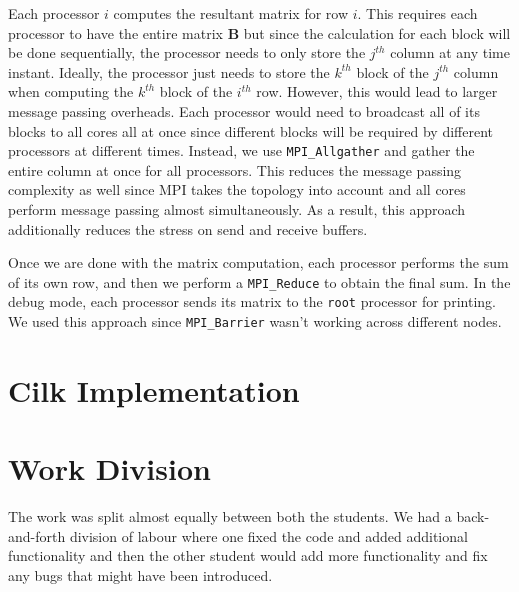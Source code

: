 \documentclass[11pt]{article}
\begin{document}
Each processor $i$ computes the resultant matrix for row $i$. This requires each processor to have the entire matrix $\mathbf{B}$ but since the calculation for each block will be done sequentially, the processor needs to only store the $j^{th}$ column at any time instant. Ideally, the processor just needs to store the $k^{th}$ block of the $j^{th}$ column when computing the $k^{th}$ block of the $i^{th}$ row. However, this would lead to larger message passing overheads. Each processor would need to broadcast all of its blocks to all cores all at once since different blocks will be required by different processors at different times. Instead, we use \texttt{MPI\_Allgather} and gather the entire column at once for all processors. This reduces the message passing complexity as well since MPI takes the topology into account and all cores perform message passing almost simultaneously. As a result, this approach additionally reduces the stress on send and receive buffers.

Once we are done with the matrix computation, each processor performs the sum of its own row, and then we perform a \texttt{MPI\_Reduce} to obtain the final sum. In the debug mode, each processor sends its matrix to the \texttt{root} processor for printing. We used this approach since \texttt{MPI\_Barrier} wasn't working across different nodes.

\section{Cilk Implementation}

\section{Work Division}
The work was split almost equally between both the students. We had a back-and-forth division of labour where one fixed the code and added additional functionality and then the other student would add more functionality and fix any bugs that might have been introduced.
\end{document}
